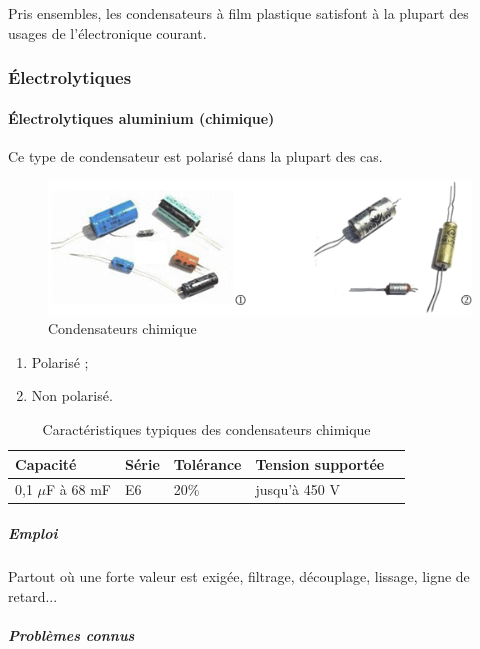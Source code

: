 \documentclass[a4paper]{article}
\begin{document}
Pris ensembles, les condensateurs à film plastique satisfont à la plupart des usages de l'électronique courant.

\subsubsection{Électrolytiques}

\paragraph{Électrolytiques aluminium (chimique)}

Ce type de condensateur est polarisé dans la plupart des cas.

\begin{figure}[H]
	\centering
	\includegraphics[scale=0.75]{Images/Condensateurs_chimique.png}
	\caption{Condensateurs chimique
		\label{Condensateurs_chimique}}
\end{figure}

\begin{enumerate}
	\item Polarisé ;
	\item Non polarisé.
\end{enumerate}

\begin{table}[H]
	\centering
		\begin{tabular}{|l|l|l|l|l|}\hline
				Capacité & Série & Tolérance & Tension supportée\\\hline
				0,1 $\mu$F à 68 mF & E6 & 20\% & jusqu'à 450 V\\\hline
		\end{tabular}
		\caption{Caractéristiques typiques des condensateurs chimique
			\label{Caracteristiques_des_condensateurs_chimique}}
\end{table}

\subparagraph{Emploi}

Partout où une forte valeur est exigée, filtrage, découplage, lissage, ligne de retard...

\subparagraph{Problèmes connus}
\end{document}
